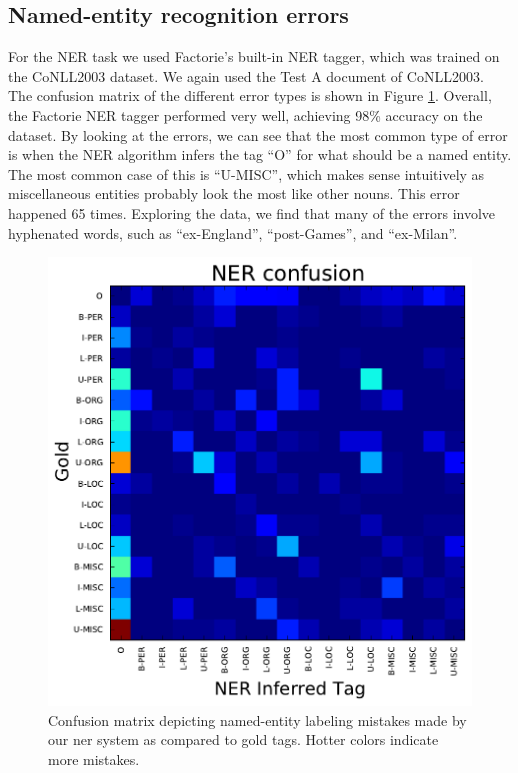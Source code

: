 \documentclass[12pt]{article}
\begin{document}
\subsection{Named-entity recognition errors}
For the NER task we used Factorie’s built-in NER tagger, which was trained on the CoNLL2003 dataset. We again used the Test A document of CoNLL2003. The confusion matrix of the different error types is shown in Figure \ref{nerconfusion}. Overall, the Factorie NER tagger performed very well, achieving 98\% accuracy on the dataset. By looking at the errors, we can see that the most common type of error is when the NER algorithm infers the tag “O” for what should be a named entity. The most common case of this is ``U-MISC'', which makes sense intuitively as miscellaneous entities probably look the most like other nouns. This error happened 65 times. Exploring the data, we find that many of the errors involve hyphenated words, such as ``ex-England'', ``post-Games'', and ``ex-Milan''. 
\begin{figure}[!ht]
\begin{center}
\includegraphics[scale=1.0]{ner_output.pdf}
\caption{Confusion matrix depicting named-entity labeling mistakes made by our ner system as compared to gold tags. Hotter colors indicate more mistakes. \label{nerconfusion}}
\end{center}
\end{figure}
\end{document}
